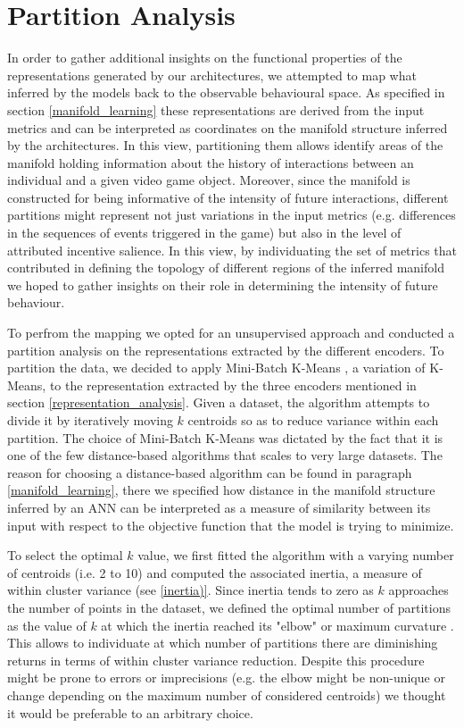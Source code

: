 \section{Partition Analysis}
\label{partition_analysese}
In order to gather additional insights on the functional properties of the representations generated by our architectures, we attempted to map what inferred by the models back to the observable behavioural space. As specified in section \ref{manifold_learning} these representations are derived from the input metrics and can be interpreted as coordinates on the manifold structure inferred by the architectures. In this view, partitioning them allows identify areas of the manifold holding information about the history of interactions between an individual and a given video game object. Moreover, since the manifold is constructed for being informative of the intensity of future interactions, different partitions might represent not just variations in the input metrics (e.g. differences in the sequences of events triggered in the game) but also in the level of attributed incentive salience. In this view, by individuating the set of metrics that contributed in defining the topology of different regions of the inferred manifold we hoped to gather insights on their role in determining the intensity of future behaviour. 

To perfrom the mapping we opted for an unsupervised approach and conducted a partition analysis on the representations extracted by the different encoders. 
To partition the data, we decided to apply Mini-Batch K-Means \cite{sculley2010web}, a variation of K-Means, to the representation extracted by the three encoders mentioned in section \ref{representation_analysis}. Given a dataset, the algorithm attempts to divide it by iteratively moving $k$ centroids so as to reduce variance within each partition. The choice of Mini-Batch K-Means was dictated by the fact that it is one of the few distance-based algorithms that scales to very large datasets. The reason for choosing a distance-based algorithm can be found in paragraph \ref{manifold_learning}, there we specified how distance in the manifold structure inferred by an ANN can be interpreted as a measure of similarity between its input with respect to the objective function that the model is trying to minimize. 

To select the optimal $k$ value, we first fitted the algorithm with a varying number of centroids (i.e. 2 to 10) and computed the associated inertia, a measure of within cluster variance (see \ref{inertia)}. Since inertia tends to zero as $k$ approaches the number of points in the dataset, we defined the optimal number of partitions as the value of $k$ at which the inertia reached its "elbow" or maximum curvature \cite{satopaa2011finding}. This allows to individuate at which number of partitions there are diminishing returns in terms of within cluster variance reduction. Despite this procedure might be prone to errors or imprecisions (e.g. the elbow might be non-unique or change depending on the maximum number of considered centroids) we thought it would be preferable to an arbitrary choice. 

